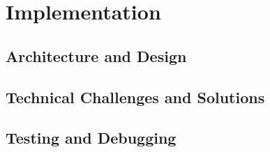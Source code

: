 \newpage
\section{Implementation}
\subsection{Architecture and Design}
\subsection{Technical Challenges and Solutions}
\subsection{Testing and Debugging}
